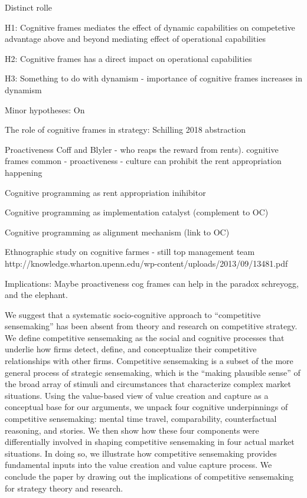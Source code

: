 Distinct rolle

H1: Cognitive frames mediates the effect of dynamic capabilities on competetive advantage
above and beyond mediating effect of operational capabilities

H2: Cognitive frames has a direct impact on operational capabilities

H3: Something to do with dynamism - importance of cognitive frames increases in dynamism

Minor hypotheses: On 

The role of cognitive frames in strategy: Schilling 2018 abstraction


Proactiveness
Coff and Blyler - who reaps the reward from rents). cognitive frames common -
proactiveness - culture can prohibit the rent appropriation happening 

Cognitive programming as rent appropriation inihibitor

Cognitive programming as implementation catalyst (complement to OC)

Cognitive programming as alignment mechanism (link to OC)






Ethnographic study on cognitive farmes - still top management team
http://knowledge.wharton.upenn.edu/wp-content/uploads/2013/09/13481.pdf

Implications: Maybe proactiveness cog frames can help in the paradox schreyogg, and the
elephant. 

We suggest that a systematic socio-cognitive approach to “competitive sensemaking” has
been absent from theory and research on competitive strategy. We define competitive
sensemaking as the social and cognitive processes that underlie how firms detect, define,
and conceptualize their competitive relationships with other firms. Competitive
sensemaking is a subset of the more general process of strategic sensemaking, which is the
“making plausible sense” of the broad array of stimuli and circumstances that characterize
complex market situations. Using the value-based view of value creation and capture as a
conceptual base for our arguments, we unpack four cognitive underpinnings of competitive
sensemaking: mental time travel, comparability, counterfactual reasoning, and stories. We
then show how these four components were differentially involved in shaping competitive
sensemaking in four actual market situations. In doing so, we illustrate how competitive
sensemaking provides fundamental inputs into the value creation and value capture
process. We conclude the paper by drawing out the implications of competitive sensemaking
for strategy theory and research.



